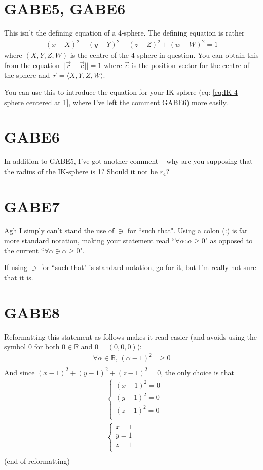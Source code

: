 \section{GABE5, GABE6}
This isn't the defining equation of a 4-sphere. The defining equation is rather
\begin{align*}
    (x-X)^2 + (y-Y)^2 + (z-Z)^2 + (w-W)^2 = 1
\end{align*}
where $(X,Y,Z,W)$ is the centre of the 4-sphere in question. You can obtain this from the equation $||\Vec{r} - \Vec{c}|| = 1$ where $\Vec{c}$ is the position vector for the centre of the sphere and $\Vec{r} = \langle X, Y, Z, W \rangle$.
\par You can use this to introduce the equation for your IK-sphere (eq: \ref{eq:IK 4 sphere centered at 1}, where I've left the comment GABE6) more easily.

\section{GABE6}
In addition to GABE5, I've got another comment -- why are you supposing that the radius of the IK-sphere is 1? Should it not be $r_4$?

\section{GABE7}
Agh I simply can't stand the use of $\ni$ for ``such that". Using a colon (:) is far more standard notation, making your statement read ``$\forall \alpha : \alpha \geq 0$" as opposed to the current ``$\forall \alpha \ni \alpha \geq 0$".
\par If using $\ni$ for ``such that" is standard notation, go for it, but I'm really not sure that it is.

\section{GABE8}
Reformatting this statement as follows makes it read easier (and avoids using the symbol $0$ for both $0 \in \mathbb{R}$ and $0 = (0,0,0)$):
\begin{align*}
    \forall\alpha\in\mathbb{R}, \, (\alpha-1)^2 &\geq 0 \\
\end{align*}
And since $(x-1)^2 + (y-1)^2 + (z-1)^2 =0$, the only choice is that
\begin{align*}
    &\begin{cases}
    (x-1)^2 = 0 \\
    (y-1)^2 = 0 \\
    (z-1)^2 = 0 \\
    \end{cases} \\
    &\begin{cases}
    x=1\\
    y=1\\
    z=1\\
    \end{cases} \\
\end{align*}
(end of reformatting)

